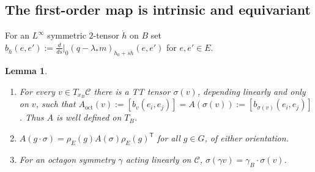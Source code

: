 \documentclass[11pt]{amsart}
\newtheorem{lemma}[theorem]{Lemma}
\theoremstyle{definition}
\theoremstyle{remark}
\newcommand{\Oct}{\mathcal{C}}
\newcommand{\ls}{\lambda_*}
\newcommand{\xB}{x_B}
\begin{document}
\subsection{The first-order map is intrinsic and equivariant}

For an $L^\infty$ symmetric $2$-tensor $\dot h$ on $B$ set
$b_{\dot h}(e,e'):=\frac{d}{ds}\big|_{0}(q-\ls m)_{h_0+s\dot h}(e,e')$ for $e,e'\in E$.

\begin{lemma}\label{lem:N}
\begin{enumerate}[label=\textup{(\alph*)}]
\item For every $v\in T_{\xB}\Oct$ there is a TT tensor $\sigma(v)$, depending linearly and
only on $v$, such that $A_{\mathrm{oct}}(v):=[b_v(e_i,e_j)]=A(\sigma(v)):=[b_{\sigma(v)}(e_i,e_j)]$.
Thus $A$ is well defined on $T_B$.
\item $A(g\cdot\sigma)=\rho_E(g)A(\sigma)\rho_E(g)^{\mathsf T}$ for all $g\in G$, of either orientation.
\item For an octagon symmetry $\gamma$ acting linearly on $\Oct$, $\sigma(\gamma v)=\gamma_B\cdot\sigma(v)$.
\end{enumerate}
\end{lemma}
\end{document}
